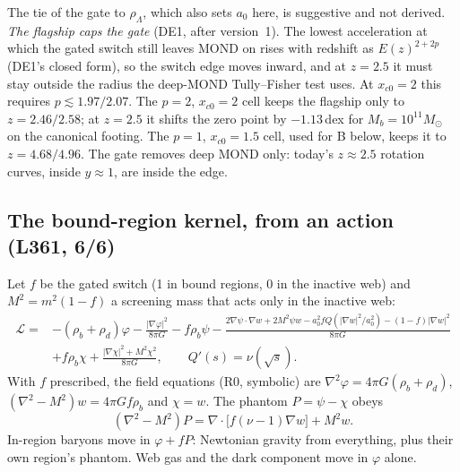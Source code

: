 \documentclass[10pt]{article}
\begin{document}
The tie of the gate to $\rho_\Lambda$, which also sets $a_0$ here, is suggestive and not derived.
\emph{The flagship caps the gate} (DE1, after version~1). The lowest acceleration at which the gated switch still leaves MOND on rises with redshift as $E(z)^{2+2p}$ (DE1's closed form), so the switch edge moves inward, and at $z=2.5$ it must stay outside the radius the deep-MOND Tully--Fisher test uses. At $x_{c0}=2$ this requires $p\lesssim1.97/2.07$. The $p=2$, $x_{c0}=2$ cell keeps the flagship only to $z=2.46/2.58$; at $z=2.5$ it shifts the zero point by $-1.13$\,dex for $M_b=10^{11}M_\odot$ on the canonical footing. The $p=1$, $x_{c0}=1.5$ cell, used for B below, keeps it to $z=4.68/4.96$. The gate removes deep MOND only: today's $z\approx2.5$ rotation curves, inside $y\approx1$, are inside the edge.

\subsection{The bound-region kernel, from an action (L361, 6/6)}
Let $f$ be the gated switch (1 in bound regions, 0 in the inactive web) and $M^2=m^2(1-f)$ a screening mass that acts only in the inactive web:
\begin{equation}
\begin{aligned}
\mathcal L={}&-(\rho_b+\rho_d)\varphi-\frac{|\nabla\varphi|^2}{8\pi G}-f\rho_b\psi-\frac{2\nabla\psi\!\cdot\!\nabla w+2M^2\psi w-a_0^2fQ(|\nabla w|^2/a_0^2)-(1-f)|\nabla w|^2}{8\pi G}\\
&+f\rho_b\chi+\frac{|\nabla\chi|^2+M^2\chi^2}{8\pi G},\qquad Q'(s)=\nu(\sqrt s).
\end{aligned}
\end{equation}
With $f$ prescribed, the field equations (R0, symbolic) are $\nabla^2\varphi=4\pi G(\rho_b+\rho_d)$, $(\nabla^2-M^2)w=4\pi Gf\rho_b$ and $\chi=w$. The phantom $P=\psi-\chi$ obeys
\begin{equation}
(\nabla^2-M^2)P=\nabla\!\cdot\!\big[f(\nu-1)\nabla w\big]+M^2w .
\end{equation}
In-region baryons move in $\varphi+fP$: Newtonian gravity from everything, plus their own region's phantom. Web gas and the dark component move in $\varphi$ alone.
\end{document}
